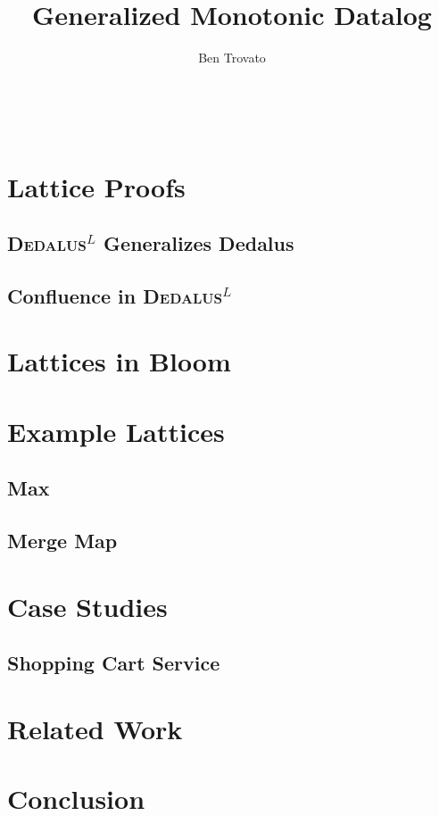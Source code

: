 \documentclass{vldb}
\def\latlang{\textsc{Dedalus}$^L$\xspace}
\begin{document}
\title{Generalized Monotonic Datalog}


\author{
\alignauthor
Ben Trovato\\
       \\
       \\
       \\
}

\maketitle

\begin{abstract}
\end{abstract}



\section{Lattice Proofs}

\subsection{\latlang Generalizes Dedalus}

\subsection{Confluence in \latlang}

\section{Lattices in Bloom}

\section{Example Lattices}

\subsection{Max}

\subsection{Merge Map}

\section{Case Studies}



\subsection{Shopping Cart Service}

\section{Related Work}

\section{Conclusion}



\end{document}

